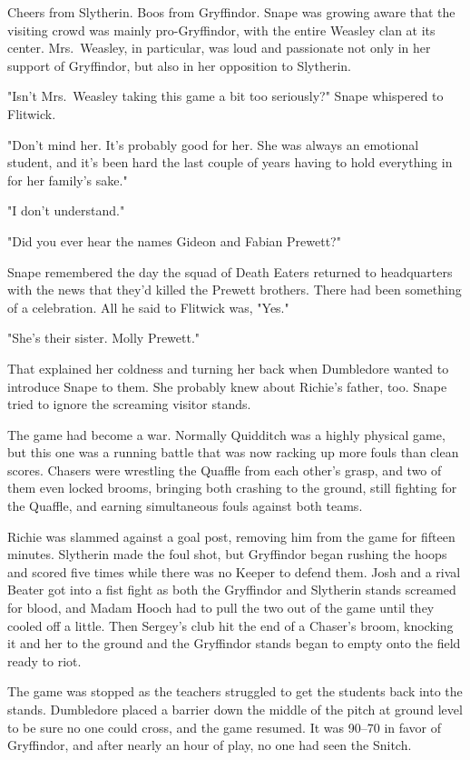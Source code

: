 Cheers from Slytherin. Boos from Gryffindor. Snape was growing aware that the visiting crowd was mainly pro-Gryffindor, with the entire Weasley clan at its center. Mrs.~Weasley, in particular, was loud and passionate not only in her support of Gryffindor, but also in her opposition to Slytherin.

"Isn't Mrs.~Weasley taking this game a bit too seriously?" Snape whispered to Flitwick.

"Don't mind her. It's probably good for her. She was always an emotional student, and it's been hard the last couple of years having to hold everything in for her family's sake."

"I don't understand."

"Did you ever hear the names Gideon and Fabian Prewett?"

Snape remembered the day the squad of Death Eaters returned to headquarters with the news that they'd killed the Prewett brothers. There had been something of a celebration. All he said to Flitwick was, "Yes."

"She's their sister. Molly Prewett."

That explained her coldness and turning her back when Dumbledore wanted to introduce Snape to them. She probably knew about Richie's father, too. Snape tried to ignore the screaming visitor stands.

The game had become a war. Normally Quidditch was a highly physical game, but this one was a running battle that was now racking up more fouls than clean scores. Chasers were wrestling the Quaffle from each other's grasp, and two of them even locked brooms, bringing both crashing to the ground, still fighting for the Quaffle, and earning simultaneous fouls against both teams.

Richie was slammed against a goal post, removing him from the game for fifteen minutes. Slytherin made the foul shot, but Gryffindor began rushing the hoops and scored five times while there was no Keeper to defend them. Josh and a rival Beater got into a fist fight as both the Gryffindor and Slytherin stands screamed for blood, and Madam Hooch had to pull the two out of the game until they cooled off a little. Then Sergey's club hit the end of a Chaser's broom, knocking it and her to the ground and the Gryffindor stands began to empty onto the field ready to riot.

The game was stopped as the teachers struggled to get the students back into the stands. Dumbledore placed a barrier down the middle of the pitch at ground level to be sure no one could cross, and the game resumed. It was 90--70 in favor of Gryffindor, and after nearly an hour of play, no one had seen the Snitch.

